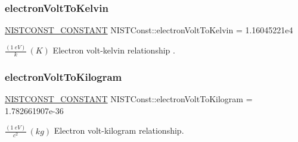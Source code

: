 \subsubsection{\texorpdfstring{electron\+Volt\+To\+Kelvin}{electronVoltToKelvin}}
{\footnotesize\ttfamily \mbox{\hyperlink{group___n_i_s_t_const-_macros_ga2b0fc1d7452373f816175dd86ce26729}{N\+I\+S\+T\+C\+O\+N\+S\+T\+\_\+\+C\+O\+N\+S\+T\+A\+NT}} N\+I\+S\+T\+Const\+::electron\+Volt\+To\+Kelvin = 1.\+16045221e4}

$\frac{(1\ eV)}{k} \ (K)$ Electron volt-\/kelvin relationship . \mbox{\label{group___n_i_s_t_const-_electron_volt_gac875b0f36fd52d70256d4a3d86eebb2e}} 
\subsubsection{\texorpdfstring{electron\+Volt\+To\+Kilogram}{electronVoltToKilogram}}
{\footnotesize\ttfamily \mbox{\hyperlink{group___n_i_s_t_const-_macros_ga2b0fc1d7452373f816175dd86ce26729}{N\+I\+S\+T\+C\+O\+N\+S\+T\+\_\+\+C\+O\+N\+S\+T\+A\+NT}} N\+I\+S\+T\+Const\+::electron\+Volt\+To\+Kilogram = 1.\+782661907e-\/36}

$\frac{(1\ eV)}{c^2} \ (kg)$ Electron volt-\/kilogram relationship. 